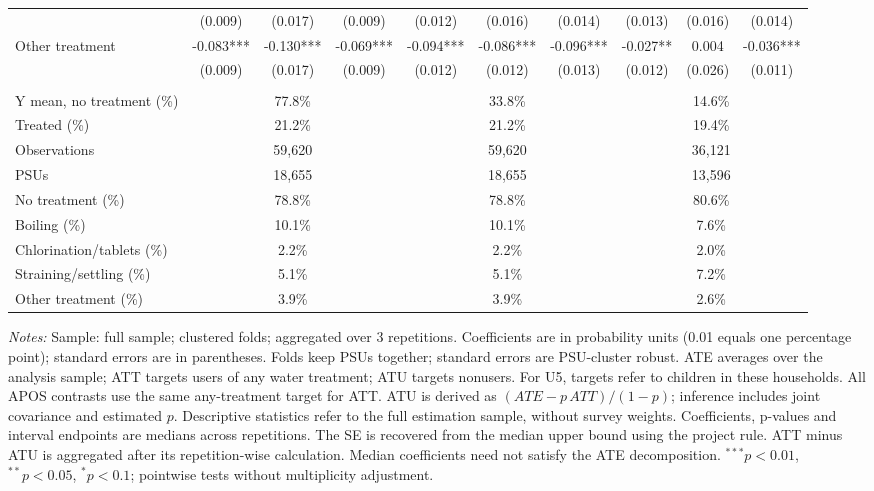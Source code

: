 \begin{table}[htbp]
\begin{adjustbox}{max width=\linewidth}
\begin{tabular}{lccccccccc}
 & (0.009) & (0.017) & (0.009) & (0.012) & (0.016) & (0.014) & (0.013) & (0.016) & (0.014) \\
Other treatment & -0.083*** & -0.130*** & -0.069*** & -0.094*** & -0.086*** & -0.096*** & -0.027** & 0.004 & -0.036*** \\
 & (0.009) & (0.017) & (0.009) & (0.012) & (0.012) & (0.013) & (0.012) & (0.026) & (0.011) \\
\addlinespace[6pt]
\multicolumn{10}{l}{\textit{Descriptive statistics and sample}} \\
Y mean, no treatment (\%) & \multicolumn{3}{c}{77.8\%} & \multicolumn{3}{c}{33.8\%} & \multicolumn{3}{c}{14.6\%} \\
Treated (\%) & \multicolumn{3}{c}{21.2\%} & \multicolumn{3}{c}{21.2\%} & \multicolumn{3}{c}{19.4\%} \\
Observations & \multicolumn{3}{c}{59,620} & \multicolumn{3}{c}{59,620} & \multicolumn{3}{c}{36,121} \\
PSUs & \multicolumn{3}{c}{18,655} & \multicolumn{3}{c}{18,655} & \multicolumn{3}{c}{13,596} \\
No treatment (\%) & \multicolumn{3}{c}{78.8\%} & \multicolumn{3}{c}{78.8\%} & \multicolumn{3}{c}{80.6\%} \\
Boiling (\%) & \multicolumn{3}{c}{10.1\%} & \multicolumn{3}{c}{10.1\%} & \multicolumn{3}{c}{7.6\%} \\
Chlorination/tablets (\%) & \multicolumn{3}{c}{2.2\%} & \multicolumn{3}{c}{2.2\%} & \multicolumn{3}{c}{2.0\%} \\
Straining/settling (\%) & \multicolumn{3}{c}{5.1\%} & \multicolumn{3}{c}{5.1\%} & \multicolumn{3}{c}{7.2\%} \\
Other treatment (\%) & \multicolumn{3}{c}{3.9\%} & \multicolumn{3}{c}{3.9\%} & \multicolumn{3}{c}{2.6\%} \\
\hline\hline
\end{tabular}
\end{adjustbox}
\par\vspace{3pt}
\begin{minipage}{\linewidth}\scriptsize \textit{Notes:} Sample: full sample; clustered folds; aggregated over 3 repetitions. Coefficients are in probability units (0.01 equals one percentage point); standard errors are in parentheses. Folds keep PSUs together; standard errors are PSU-cluster robust. ATE averages over the analysis sample; ATT targets users of any water treatment; ATU targets nonusers. For U5, targets refer to children in these households. All APOS contrasts use the same any-treatment target for ATT. ATU is derived as $(ATE-p\,ATT)/(1-p)$; inference includes joint covariance and estimated $p$. Descriptive statistics refer to the full estimation sample, without survey weights. Coefficients, p-values and interval endpoints are medians across repetitions. The SE is recovered from the median upper bound using the project rule. ATT minus ATU is aggregated after its repetition-wise calculation. Median coefficients need not satisfy the ATE decomposition. $^{***}p<0.01$, $^{**}p<0.05$, $^{*}p<0.1$; pointwise tests without multiplicity adjustment.\end{minipage}
\end{table}
